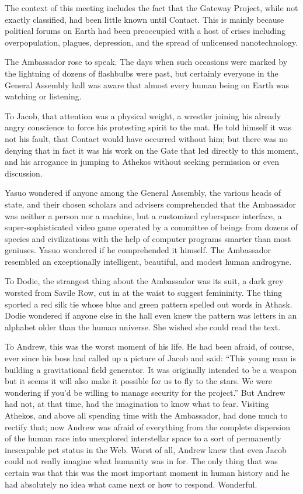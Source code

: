 \documentclass[english,11pt,letterpaper,onecolumn]{scrbook}
\begin{document}
	The context of this meeting includes the fact that the Gateway Project, while not exactly classified, had been little known until Contact.  This is mainly because political forums on Earth had been preoccupied with a host of crises including overpopulation, plagues, depression, and the spread of unlicensed nanotechnology.

	The Ambassador rose to speak.  The days when such occasions were marked by the lightning of dozens of flashbulbs were past, but certainly everyone in the General Assembly hall was aware that almost every human being on Earth was watching or listening.
	
	To Jacob, that attention was a physical weight, a wrestler joining his already angry conscience to force his protesting spirit to the mat.  He told himself it was not his fault, that Contact would have occurred without him; but there was no denying that in fact it was his work on the Gate that led directly to this moment, and his arrogance in jumping to Athekos without seeking permission or even discussion.
	
	Yasuo wondered if anyone among the General Assembly, the various heads of state, and their chosen scholars and advisers comprehended that the Ambassador was neither a person nor a machine, but a customized cyberspace interface, a super-sophisticated video game operated by a committee of beings from dozens of species and civilizations with the help of computer programs smarter than most geniuses.  Yasuo wondered if he comprehended it himself.  The Ambassador resembled an exceptionally intelligent, beautiful, and modest human androgyne.
	
	To Dodie, the strangest thing about the Ambassador was its suit, a dark grey worsted from Savile Row, cut in at the waist to suggest femininity.  The thing sported a red silk tie whose blue and green pattern spelled out words in Athask.  Dodie wondered if anyone else in the hall even knew the pattern was letters in an alphabet older than the human universe.  She wished she could read the text.
	
	To Andrew, this was the worst moment of his life.  He had been afraid, of course, ever since his boss had called up a picture of Jacob and said:  ``This young man is building a gravitational field generator.  It was originally intended to be a weapon but it seems it will also make it possible for us to fly to the stars.  We were wondering if you'd be willing to manage security for the project.''  But Andrew had not, at that time, had the imagination to know what to fear.  Visiting Athekos, and above all spending time with the Ambassador, had done much to rectify that; now Andrew was afraid of everything from the complete dispersion of the human race into unexplored interstellar space to a sort of permanently inescapable pet status in the Web.  Worst of all, Andrew knew that even Jacob could not really imagine what humanity was in for.  The only thing that was certain was that this was the most important moment in human history and he had absolutely no idea what came next or how to respond.  Wonderful.
	
\end{document}
